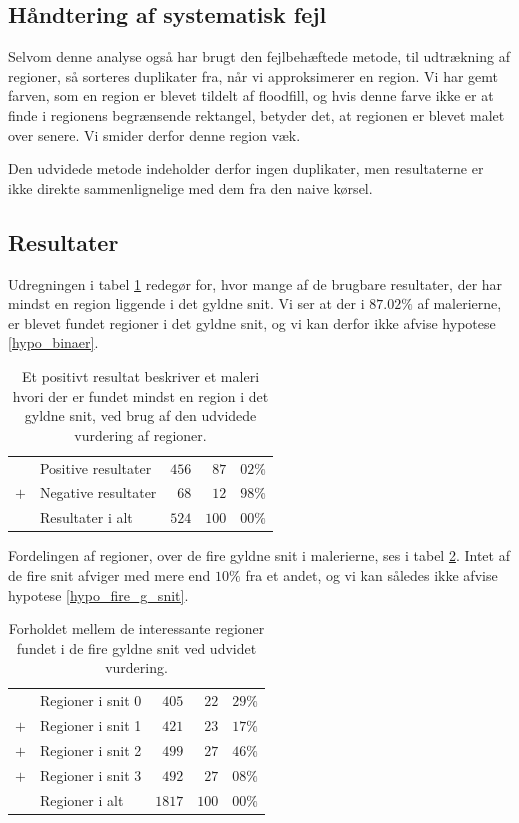 {\subsection{Håndtering af systematisk fejl}
Selvom denne analyse også har brugt den fejlbehæftede metode, til
udtrækning af regioner, så sorteres duplikater fra, når vi approksimerer
en region. Vi har gemt farven, som en region er blevet tildelt af
floodfill, og hvis denne farve ikke er at finde i regionens begrænsende
rektangel, betyder det, at regionen er blevet malet over senere. Vi
smider derfor denne region væk.

Den udvidede metode indeholder derfor ingen duplikater, men resultaterne
er ikke direkte sammenlignelige med dem fra den naive kørsel.

\subsection{Resultater}
Udregningen i tabel \ref{ud_tabel_fordeling} redegør for, hvor mange af
de brugbare resultater, der har mindst en region liggende i det gyldne
snit. Vi ser at der i $87.02\%$ af malerierne, er blevet fundet regioner
i det gyldne snit, og vi kan derfor ikke afvise hypotese
\ref{hypo_binaer}.

\begin{table}[H]
    \centering
    \begin{tabular}{r@{\ \ }p{12em}r|r@{.}l}
            & Positive resultater   & $456$ &  $87$ & $02\%$ \\
        $+$ & Negative resultater   &  $68$ &  $12$ & $98\%$ \\\hline
            & Resultater i alt      & $524$ & $100$ & $00\%$
    \end{tabular}
    \caption[]{Et positivt resultat beskriver et maleri hvori der er
    fundet mindst en region i det gyldne snit, ved brug af den udvidede
    vurdering af regioner.}
    \label{ud_tabel_fordeling}
\end{table}

Fordelingen af regioner, over de fire gyldne snit i malerierne, ses i
tabel \ref{ud_tabel_fire_snit}. Intet af de fire snit afviger med
mere end $10\%$ fra et andet, og vi kan således ikke afvise hypotese
\ref{hypo_fire_g_snit}.

\begin{table}[H]
    \centering
    \begin{tabular}{r@{\ \ }p{12em}r|r@{.}l}
            & Regioner i snit 0   &  $405$ &  $22$ & $29\%$ \\
        $+$ & Regioner i snit 1   &  $421$ &  $23$ & $17\%$ \\
        $+$ & Regioner i snit 2   &  $499$ &  $27$ & $46\%$ \\
        $+$ & Regioner i snit 3   &  $492$ &  $27$ & $08\%$ \\\hline
            & Regioner i alt      & $1817$ & $100$ & $00\%$
    \end{tabular}
    \caption[]{Forholdet mellem de interessante regioner fundet i de
    fire gyldne snit ved udvidet vurdering.}
    \label{ud_tabel_fire_snit}
\end{table}

}
